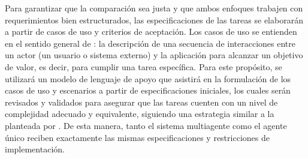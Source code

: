 Para garantizar que la comparación sea justa y que ambos enfoques trabajen con requerimientos bien estructurados, las especificaciones de las tareas se elaborarán a partir de casos de uso y criterios de aceptación. Los casos de uso se entienden en el sentido general de \textcite{jacobson1992oose}: la descripción de una secuencia de interacciones entre un actor (un usuario o sistema externo) y la aplicación para alcanzar un objetivo de valor, es decir, para cumplir una tarea específica. Para este propósito, se utilizará un modelo de lenguaje de apoyo que asistirá en la formulación de los casos de uso y escenarios a partir de especificaciones iniciales, los cuales serán revisados y validados para asegurar que las tareas cuenten con un nivel de complejidad adecuado y equivalente, siguiendo una estrategia similar a la planteada por \textcite{donato2026rolebased}. De esta manera, tanto el sistema multiagente como el agente único reciben exactamente las mismas especificaciones y restricciones de implementación.


